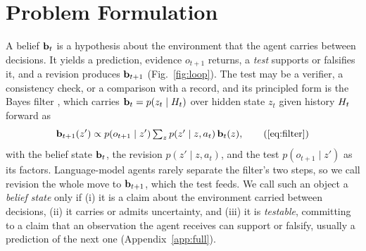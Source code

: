 \section{Problem Formulation}
\label{sec:formulation}

\ifnature\else
A belief $\mathbf{b}_t$ is a hypothesis about the environment that the agent carries between decisions. It yields a prediction, evidence $o_{t+1}$ returns, a \emph{test} supports or falsifies it, and a revision produces $\mathbf{b}_{t+1}$ (Fig.~\ref{fig:loop}). The test may be a verifier, a consistency check, or a comparison with a record, and its principled form is the Bayes filter \citep{astrom1965optimal,thrun2005probabilistic}, which carries $\mathbf{b}_t = p(z_t \mid H_t)$ over hidden state $z_t$ given history $H_t$ forward as
\begin{equation}
\belief_{t+1}(z') \propto p(o_{t+1} \mid z') \textstyle\sum_{z} p(z' \mid z, a_t)\, \belief_t(z),
\eqfilterlab
\end{equation}
with the belief state $\mathbf{b}_t$, the revision $p(z' \mid z, a_t)$, and the test $p(o_{t+1} \mid z')$ as its factors. Language-model agents rarely separate the filter's two steps, so we call revision the whole move to $\mathbf{b}_{t+1}$, which the test feeds. We call such an object a \emph{belief state} only if (i) it is a claim about the environment carried between decisions, (ii) it carries or admits uncertainty, and (iii) it is \emph{testable}, committing to a claim that an observation the agent receives can support or falsify, usually a prediction of the next one (Appendix~\ref{app:full}).
\fi
